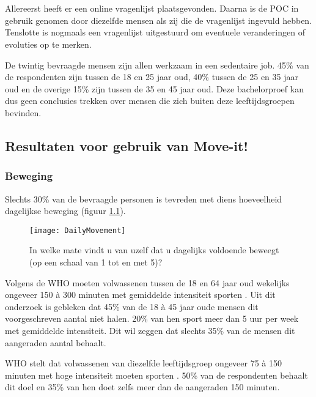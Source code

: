 \chapter{}%
\label{ch:analyse}

Allereerst heeft er een online vragenlijst plaatsgevonden. Daarna is de POC in gebruik genomen door diezelfde mensen als zij die de vragenlijst ingevuld hebben. Tenslotte is nogmaals een vragenlijst uitgestuurd om eventuele veranderingen of evoluties op te merken.

De twintig bevraagde mensen zijn allen werkzaam in een sedentaire job. 45\% van de respondenten zijn tussen de 18 en 25 jaar oud, 40\% tussen de 25 en 35 jaar oud en de overige 15\% zijn tussen de 35 en 45 jaar oud. Deze bachelorproef kan dus geen conclusies trekken over mensen die zich buiten deze leeftijdsgroepen bevinden.

\section{Resultaten voor gebruik van Move-it!}

\subsection{Beweging}
Slechts 30\% van de bevraagde personen is tevreden met diens hoeveelheid dagelijkse beweging (figuur \ref{fig:dagelijkseBeweging}).

\begin{figure}[h]
    \caption[In welke mate vindt u van uzelf dat u dagelijks voldoende beweegt (op een schaal van 1 tot en met 5, gaande van 1 voor absoluut te weinig bewegen, tot en met 5 voor meer dan voldoende bewegen)?]{In welke mate vindt u van uzelf dat u dagelijks voldoende beweegt (op een schaal van 1 tot en met 5)?}
    \texttt{[image: DailyMovement]}
    \label{fig:dagelijkseBeweging}
\end{figure}

Volgens de WHO moeten volwassenen tussen de 18 en 64 jaar oud wekelijks ongeveer 150 à 300 minuten met gemiddelde intensiteit sporten \autocite{Bull2020}.
Uit dit onderzoek is gebleken dat 45\% van de 18 à 45 jaar oude mensen dit voorgeschreven aantal niet halen. 20\% van hen sport meer dan 5 uur per week met gemiddelde intensiteit. Dit wil zeggen dat slechts 35\% van de mensen dit aangeraden aantal behaalt.

WHO stelt dat volwassenen van diezelfde leeftijdsgroep ongeveer 75 à 150 minuten met hoge intensiteit moeten sporten \autocite{Bull2020}.
50\% van de respondenten behaalt dit doel en 35\% van hen doet zelfs meer dan de aangeraden 150 minuten.

